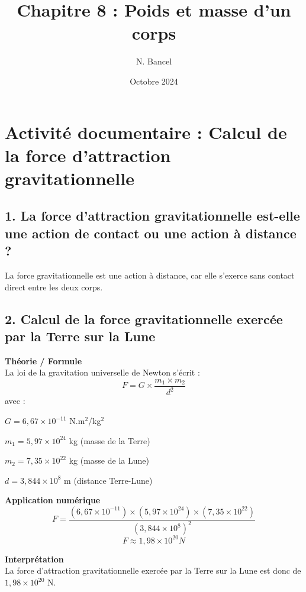\documentclass[a4paper,12pt]{article}
\begin{document}
\title{Chapitre 8 : Poids et masse d'un corps}
\author{N. Bancel}
\date{Octobre 2024}
\maketitle

\section*{Activité documentaire : Calcul de la force d'attraction gravitationnelle}

\subsection*{1. La force d’attraction gravitationnelle est-elle une action de contact ou une action à distance ?}
La force gravitationnelle est une action à distance, car elle s’exerce sans contact direct entre les deux corps.

\subsection*{2. Calcul de la force gravitationnelle exercée par la Terre sur la Lune}
\begin{compactenum}
    \item \textbf{Théorie / Formule} \\
    La loi de la gravitation universelle de Newton s'écrit :
    \begin{equation}
        F = G \times \frac{m_1 \times m_2}{d^2}
    \end{equation}
    avec :
    \begin{compactenum}
        \item $G = 6,67 \times 10^{-11}$ N.m$^2$/kg$^2$
        \item $m_1 = 5,97 \times 10^{24}$ kg (masse de la Terre)
        \item $m_2 = 7,35 \times 10^{22}$ kg (masse de la Lune)
        \item $d = 3,844 \times 10^8$ m (distance Terre-Lune)
    \end{compactenum}

    \item \textbf{Application numérique} \\
    \begin{equation}
        F = \frac{(6,67 \times 10^{-11}) \times (5,97 \times 10^{24}) \times (7,35 \times 10^{22})}{(3,844 \times 10^8)^2}
    \end{equation}
    \begin{equation}
        F \approx 1,98 \times 10^{20} N
    \end{equation}

    \item \textbf{Interprétation} \\
    La force d’attraction gravitationnelle exercée par la Terre sur la Lune est donc de $1,98 \times 10^{20}$ N.
\end{compactenum}
\end{document}
